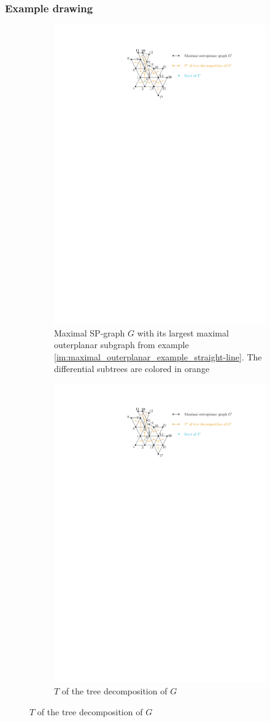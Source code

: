 \subsubsection{Example drawing}

\begin{figure}[H]
	\centering
	\begin{subfigure}{\textwidth}
		\centering
		\includegraphics[page=10,width=0.8\linewidth]{graphics/maximal_outerplanar_example_drawings.pdf}
			\caption{Maximal SP-graph $G$ with its largest maximal outerplanar subgraph from example \ref{im:maximal_outerplanar_example_straight-line}. The differential subtrees are colored in orange}
	\end{subfigure}
	\begin{subfigure}{\textwidth}
	\centering
	\includegraphics[page=11,width=0.5\linewidth]{graphics/maximal_outerplanar_example_drawings.pdf}
		\caption{$T$ of the tree decomposition of $G$}
\end{subfigure}


\end{figure}
